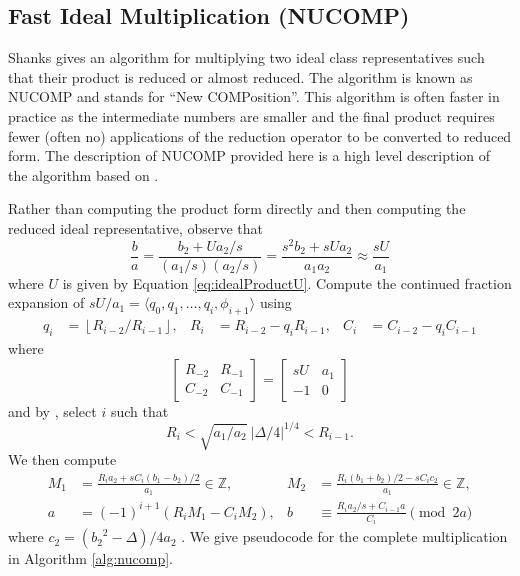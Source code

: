 \documentclass{ucalgthes1}
\theoremstyle{definition}
\newcommand{\ZZ}{\mathbb{Z}}
\newcommand{\matrixtt}[4]{\left[ \begin{array}{rr} #1 & #2 \\ #3 & #4 \end{array} \right]}
\newcommand{\floor}[1]{\left\lfloor #1 \right\rfloor}
\begin{document}
\subsection{Fast Ideal Multiplication (NUCOMP)}
\label{subsec:nucomp}

Shanks gives an algorithm for multiplying two ideal class representatives such that their product is reduced or almost reduced.  The algorithm is known as NUCOMP and stands for ``New COMPosition''.  This algorithm is often faster in practice as the intermediate numbers are smaller and the final product requires fewer (often no) applications of the reduction operator to be converted to reduced form. The description of NUCOMP provided here is a high level description of the algorithm based on \cite[pp.119-123]{Jacobson09}.

Rather than computing the product form directly and then computing the reduced ideal representative, observe that
\[
	\frac{b}{a} = \frac{b_2 + Ua_2/s}{(a_1/s)(a_2/s)} 
	= \frac{s^2 b_2+sUa_2}{a_1a_2}
	\approx \frac{sU}{a_1}
\]
where $U$ is given by Equation \ref{eq:idealProductU}.  Compute the continued fraction expansion of $sU/a_1 = \langle q_0, q_1, \dots, q_i, \phi_{i+1} \rangle$ using
\begin{align*}
	q_i &= \floor{R_{i-2} / R_{i-1}}, &
	R_i &= R_{i-2} - q_i R_{i-1}, &
	C_i &= C_{i-2} - q_i C_{i-1}
\end{align*}
where
\[
	\matrixtt{R_{-2}}{R_{-1}}{C_{-2}}{C_{-1}} = \matrixtt{sU}{a_1}{-1}{0}
\]
and by \cite[Theorem 5.43]{Jacobson09}, select $i$ such that
\[
	R_i < \sqrt{a_1/a_2} ~ |\Delta/4|^{1/4} < R_{i-1}.
\]
We then compute
\begin{align*}
	M_1 &= \frac{R_i a_2 + sC_i(b_1-b_2)/2}{a_1}  \in \ZZ, &
	M_2 &= \frac{R_i (b_1+b_2)/2 - s C_i c_2}{a_1} \in \ZZ, \\
	a &= (-1)^{i+1} (R_i M_1  - C_i M_2), &
	b &\equiv \frac{R_i a_2 /s + C_{i-1} a}{C_i} \pmod{2a}
\end{align*}
where $c_2 = ({b_2}^2-\Delta)/4a_2$ \cite[Equation 5.44]{Jacobson09}.  We give pseudocode for the complete multiplication in Algorithm \ref{alg:nucomp}.
\end{document}
